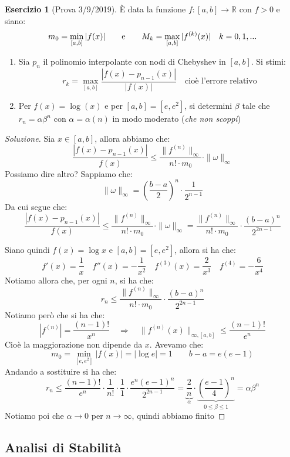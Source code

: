 \documentclass[11pt,a4paper,twoside]{article}
\theoremstyle{definition}
\newtheorem*{ese}{Esercizio}
\newenvironment{sol}
	{\renewcommand\qedsymbol{$\blacksquare$}\begin{proof}[Soluzione]}
	{\end{proof}}
\begin{document}
\begin{ese}[Prova 3/9/2019]
	È data la funzione $f:[a,b] \to \mathbb R$ con $f>0$ e siano:
	\[ m_0 = \min_{[a,b]}|f(x)|\qquad \text e \qquad M_k = \max_{[a,b]}|f^{(k)}(x)|\quad k = 0,1,... \]
	\begin{enumerate}
		\item Sia $p_n$ il polinomio interpolante con nodi di Chebyshev in $[a,b]$. Si stimi:
			\[ r_k = \max_{[a,b]} \frac{|f(x) - p_{n-1}(x)|}{|f(x)|}\quad \text{cioè l'errore relativo} \]
		\item Per $f(x) = \log (x)$ e per $[a,b] = [e, e^2]$, si determini $\beta$ tale che $r_n = \alpha \beta^n$ con $\alpha = \alpha(n)$ in modo moderato (\textit{che non scoppi})
	\end{enumerate}
\end{ese}

\begin{sol}
	 Sia $x \in [a,b]$, allora abbiamo che:
	\[ \frac{|f(x)-p_{n-1}(x)|}{f(x)}\leq \frac{\|f^{(n)}\|_\infty}{n!\cdot m_0}\cdot \|\omega\|_\infty \]
	Possiamo dire altro? Sappiamo che:
	\[\|\omega\|_\infty = \left( \frac{b-a}2 \right)^n \cdot \frac 1{2^{n-1}}\]
	Da cui segue che:
	\[ \frac{|f(x)-p_{n-1}(x)|}{f(x)}\leq \frac{\|f^{(n)}\|_\infty}{n!\cdot  m_0}\cdot \|\omega\|_\infty = \frac{\|f^{(n)}\|_\infty}{n!\cdot m_0}\cdot \frac{(b-a)^n}{2^{2n-1}}\]

	 Siano quindi $f(x) = \log x$ e $[a,b] = [e,e^2]$, allora si ha che:
	\[ f'(x) = \frac 1x \quad f''(x) = -\frac 1{x^2}\quad f^{(3)}(x)=\frac 2{x^3}\quad f^{(4)}=-\frac 6{x^4}\]
	Notiamo allora che, per ogni $n$, si ha che:
	\[ r_n \leq \frac{\|f^{(n)}\|_\infty}{n! \cdot m_0}\cdot \frac{(b-a)^n}{2^{2n-1}} \]
	Notiamo però che si ha che:
	\[ |f^{(n)}|=\frac{(n-1)!}{x^n} \quad \Rightarrow \quad \|f^{(n)}(x)\|_{\infty, [a,b]} \leq \frac{(n-1)!}{e^n} \]
	Cioè la maggiorazione non dipende da $x$. Avevamo che:
	\[ m_0 = \min_{[e,e^2]} |f(x)| = |\log e| = 1\qquad b-a  = e(e-1) \]
	Andando a sostituire si ha che:
	\[ r_n \leq \frac{(n-1)!}{e^n}\cdot \frac 1{n!}\cdot \frac 11 \cdot \frac{e^n(e-1)^n}{2^{2n-1}} = \underbrace{\frac 2n}_\alpha \cdot \underbrace{\left( \frac{e-1}4 \right)^n}_{0\leq \beta \leq 1} = \alpha \beta^n \]
	Notiamo poi che $\alpha \to 0$ per $n \to \infty$, quindi abbiamo finito
\end{sol}

\subsection{Analisi di Stabilità}
\end{document}
